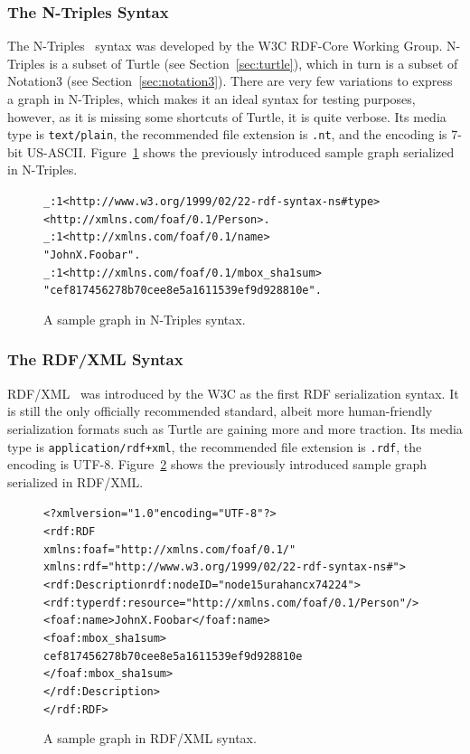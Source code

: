 \documentclass[12pt]{article}
\newenvironment{code}[1]
{\begin{lrbox}{\inverbatim}\begin{minipage}{13.5cm}\begin{alltt}{#1}}
{\end{alltt}\end{minipage}\end{lrbox}\colorbox{lightgray}{\usebox{\inverbatim}}}
\begin{document}
\subsubsection{The N-Triples Syntax} \label{sec:n-triples}
The N-Triples~\cite{rdf-n-triples} syntax was developed by the W3C RDF-Core Working Group. N-Triples is a subset of Turtle (see Section~\ref{sec:turtle}), which in turn is a subset of Notation3 (see Section~\ref{sec:notation3}). There are very few variations to express a graph in N-Triples, which makes it an ideal syntax for testing purposes, however, as it is missing some shortcuts of Turtle, it is quite verbose. Its media type is \texttt{text/plain}, the recommended file extension is \texttt{.nt}, and the encoding is 7-bit US-ASCII. Figure~\ref{code:ntriples-syntax} shows the previously introduced sample graph serialized in N-Triples.

\begin{figure}[htbp!]
\begin{center}
{\footnotesize
\begin{code}
\_:1 <http://www.w3.org/1999/02/22-rdf-syntax-ns#type>
    <http://xmlns.com/foaf/0.1/Person> .
\_:1 <http://xmlns.com/foaf/0.1/name>
    "John X. Foobar" .
\_:1 <http://xmlns.com/foaf/0.1/mbox_sha1sum>
    "cef817456278b70cee8e5a1611539ef9d928810e" .
\end{code}}
  \caption{A sample graph in N-Triples syntax.}
  \label{code:ntriples-syntax}
  \end{center}  
\end{figure}

\subsubsection{The RDF/XML Syntax}
RDF/XML~\cite{Beckett2004} was introduced by the W3C as the first RDF serialization syntax. It is still the only officially recommended standard, albeit more human-friendly serialization formats such as Turtle are gaining more and more traction. Its media type is \texttt{application/rdf+xml}, the recommended file extension is \texttt{.rdf}, the encoding is UTF-8. Figure~\ref{code:rdfxml-syntax} shows the previously introduced sample graph serialized in RDF/XML.

\begin{figure}[htbp!]
\begin{center}
{\footnotesize
\begin{code}
<?xml version="1.0" encoding="UTF-8"?>
<rdf:RDF
    xmlns:foaf="http://xmlns.com/foaf/0.1/"
    xmlns:rdf="http://www.w3.org/1999/02/22-rdf-syntax-ns#">
  <rdf:Description rdf:nodeID="node15urahancx74224">
    <rdf:type rdf:resource="http://xmlns.com/foaf/0.1/Person"/>
    <foaf:name>John X. Foobar</foaf:name>
    <foaf:mbox_sha1sum>
      cef817456278b70cee8e5a1611539ef9d928810e
    </foaf:mbox_sha1sum>
  </rdf:Description>
</rdf:RDF>
\end{code}}
  \caption{A sample graph in RDF/XML syntax.}
  \label{code:rdfxml-syntax}
  \end{center}  
\end{figure}
\end{document}
